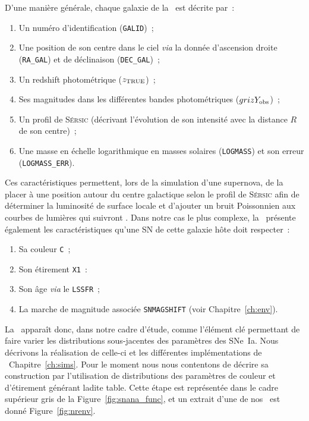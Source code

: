 \documentclass[../main/main.tex]{subfiles}
\begin{document}
D'une manière générale, chaque galaxie de la \hostlib\ est décrite par~:
\begin{enumerate}
    \item Un numéro d'identification (\texttt{GALID})~;
    \item Une position de son centre dans le ciel \textit{via} la donnée
        d'ascension droite (\texttt{RA\_GAL}) et de déclinaison
        (\texttt{DEC\_GAL})~;
    \item Un redshift photométrique ($z_{\rm TRUE}$)~;
    \item Ses magnitudes dans les différentes bandes photométriques ($grizY_{\rm
        obs}$)~;
    \item Un profil de \textsc{Sérsic} (décrivant l'évolution de son intensité
        avec la distance $R$ de son centre)~;
    \item Une masse en échelle logarithmique en masses solaires
        (\texttt{LOGMASS}) et son erreur (\texttt{LOGMASS\_ERR}).
\end{enumerate}
Ces caractéristiques permettent, lors de la simulation d'une supernova, de la
placer à une position autour du centre galactique selon le profil de
\textsc{Sérsic} afin de déterminer la luminosité de surface locale et d'ajouter
un bruit Poissonnien aux courbes de lumières qui suivront \citep{kessler2019}.
Dans notre cas le plus complexe, la \hostlib\ présente également les
caractéristiques qu'une SN de cette galaxie hôte doit respecter~:
\begin{enumerate}[resume]
    \item Sa couleur \texttt{C}~;
    \item Son étirement \texttt{X1}~:
    \item Son âge \textit{via} le \texttt{LSSFR}~;
    \item La marche de magnitude associée \texttt{SNMAGSHIFT} (voir
        Chapitre~\ref{ch:env}).
\end{enumerate}
La \hostlib\ apparaît donc, dans notre cadre d'étude, comme l'élément clé
permettant de faire varier les distributions sous-jacentes des paramètres des
SNe~Ia. Nous décrivons la réalisation de celle-ci et les différentes
implémentations de \hostlib\ Chapitre~\ref{ch:sims}. Pour le moment nous nous
contentons de décrire sa construction par l'utilisation de distributions des
paramètres de couleur et d'étirement générant ladite table. Cette étape est
représentée dans le cadre supérieur gris de la Figure~\ref{fig:snana_func}, et
un extrait d'une de nos \hostlib\ est donné Figure~\ref{fig:nrenv}.
\end{document}
